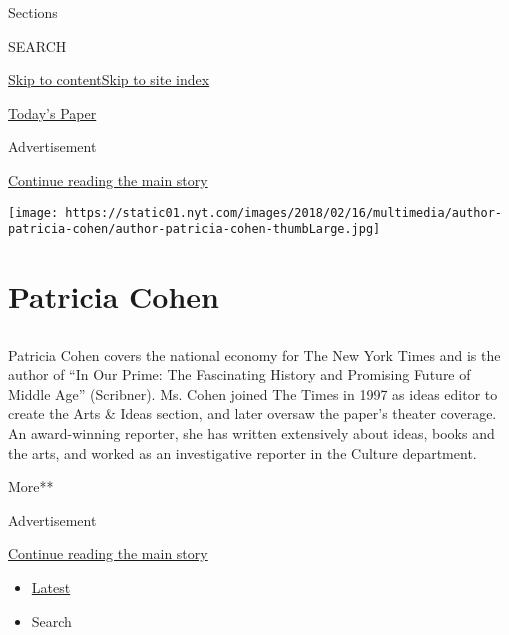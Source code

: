 Sections

SEARCH

\protect\hyperlink{site-content}{Skip to
content}\protect\hyperlink{site-index}{Skip to site index}

\href{https://myaccount.nytimes.com/auth/login?response_type=cookie\&client_id=vi}{}

\href{https://www.nytimes.com/section/todayspaper}{Today's Paper}

Advertisement

\protect\hyperlink{after-top}{Continue reading the main story}

\texttt{[image: https://static01.nyt.com/images/2018/02/16/multimedia/author-patricia-cohen/author-patricia-cohen-thumbLarge.jpg]}

\hypertarget{patricia-cohen}{%
\section{Patricia Cohen}\label{patricia-cohen}}

\hypertarget{section}{%
\subsection{}\label{section}}

Patricia Cohen covers the national economy for The New York Times and is
the author of ``In Our Prime: The Fascinating History and Promising
Future of Middle Age'' (Scribner). Ms. Cohen joined The Times in 1997 as
ideas editor to create the Arts \& Ideas section, and later oversaw the
paper's theater coverage. An award-winning reporter, she has written
extensively about ideas, books and the arts, and worked as an
investigative reporter in the Culture department.

More**

Advertisement

\protect\hyperlink{after-mid1}{Continue reading the main story}

\begin{itemize}
\tightlist
\item
  \protect\hyperlink{stream-panel}{Latest}
\item
  Search
\end{itemize}

